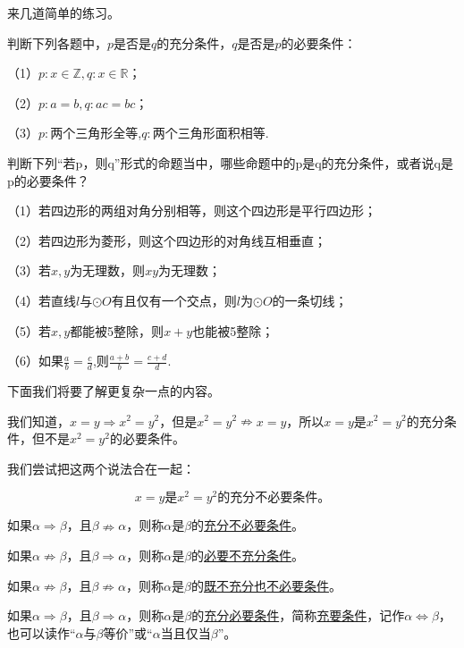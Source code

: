 \documentclass[lang=cn,math=cm,chinesefont=nofont,11pt,scheme=chinese,onecol]{elegantbook}
\begin{document}
来几道简单的练习。

\begin{exercise}\label{202406262010}
  判断下列各题中，$p$是否是$q$的充分条件，$q$是否是$p$的必要条件：

  （1）$p:x\in\mathbb{Z},q:x\in\mathbb{R}$；

  （2）$p:a=b,q:ac=bc$；

  （3）$p:$两个三角形全等,$q:$两个三角形面积相等.
\end{exercise}

\begin{exercise}\label{202406262101}
  判断下列“若p，则q”形式的命题当中，哪些命题中的p是q的充分条件，或者说q是p的必要条件？

  （1）若四边形的两组对角分别相等，则这个四边形是平行四边形；

  （2）若四边形为菱形，则这个四边形的对角线互相垂直；

  （3）若$x,y$为无理数，则$xy$为无理数；

  （4）若直线$l$与$\odot O$有且仅有一个交点，则$l$为$\odot O$的一条切线；

  （5）若$x,y$都能被5整除，则$x+y$也能被5整除；

  （6）如果$\frac{a}{b}=\frac{c}{d}$,则$\frac{a+b}{b}=\frac{c+d}{d}$.
\end{exercise}

\hspace*{\fill}

下面我们将要了解更复杂一点的内容。

我们知道，$x=y\Rightarrow x^2=y^2$，但是$x^2=y^2\nRightarrow x=y$，所以$x=y$是$x^2=y^2$的充分条件，但不是$x^2=y^2$的必要条件。

我们尝试把这两个说法合在一起：

$$x=y\text{是}x^2=y^2\text{的}\textbf{充分不必要条件。}$$

\begin{definition}
  如果$\alpha\Rightarrow\beta$，且$\beta\nRightarrow\alpha$，则称$\alpha$是$\beta$的\underline{充分不必要条件}。

  如果$\alpha\nRightarrow\beta$，且$\beta\Rightarrow\alpha$，则称$\alpha$是$\beta$的\underline{必要不充分条件}。

  如果$\alpha\nRightarrow\beta$，且$\beta\nRightarrow\alpha$，则称$\alpha$是$\beta$的\underline{既不充分也不必要条件}。

  如果$\alpha\Rightarrow\beta$，且$\beta\Rightarrow\alpha$，则称$\alpha$是$\beta$的\underline{充分必要条件}，简称\underline{充要条件}，记作$\alpha\Leftrightarrow\beta$，也可以读作“$\alpha$与$\beta$等价”或“$\alpha$当且仅当$\beta$”。
\end{definition}
\end{document}
